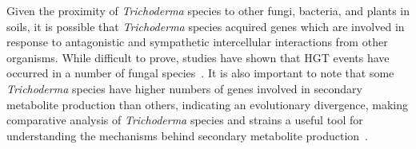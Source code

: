 Given the proximity of \textit{Trichoderma} species to other fungi, bacteria, and plants in soils, it is possible that \textit{Trichoderma} species acquired genes which are involved in response to antagonistic and sympathetic intercellular interactions from other organisms. While difficult to prove, studies have shown that HGT events have occurred in a number of fungal species~\cite{fitzpatrick2012}. It is also important to note that some \textit{Trichoderma} species have higher numbers of genes involved in secondary metabolite production than others, indicating an evolutionary divergence, making comparative analysis of \textit{Trichoderma} species and strains a useful tool for understanding the mechanisms behind secondary metabolite production~\cite{Mukherjee2012}.



